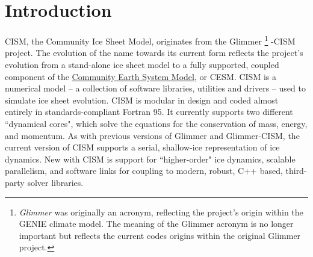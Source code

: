 
\section{Introduction}
%
CISM, the Community Ice Sheet Model, originates from the Glimmer
\footnote{{\it Glimmer} was originally an acronym, reflecting the project's origin 
within the GENIE climate model. The meaning of the Glimmer acronym is no longer important 
but reflects the current codes origins within the original Glimmer project.}
-CISM project. The evolution of the name towards its current form reflects 
the project's evolution from a stand-alone ice sheet model to a fully supported, 
coupled component of the \href{http://www2.cesm.ucar.edu/}{Community Earth System Model}, or CESM. 
CISM is a numerical model -- a collection of software libraries, utilities and drivers  --
 used to simulate ice sheet evolution. CISM is modular in design and coded almost 
entirely in standards-compliant Fortran 95. It currently supports two different 
``dynamical cores", which solve the equations for the conservation of mass, energy, and momentum. 
As with previous versions of Glimmer and Glimmer-CISM, the current version of CISM 
supports a serial, shallow-ice representation of ice dynamics. 
New with CISM is support for ``higher-order" ice dynamics, scalable parallelism, 
and software links for coupling to modern, robust, C++ based, third-party solver libraries. 

%
